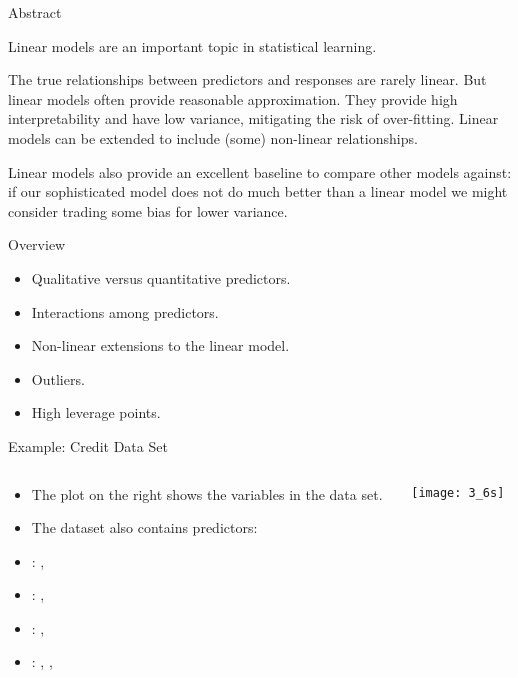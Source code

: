 \documentclass[mathserif, aspectratio=169]{beamer}
\subtitle{\bfseries%
  {Linear Regression, Part 3}\\%
  {\tiny\it qualitative predictors, interaction \& non-linear extensions, outliers, high leverage points}\\%
}
\begin{document}


\begin{frame}{Abstract}

	\begin{blurb}
		Linear models are an important topic in statistical learning.  

		The true relationships between predictors and responses are rarely linear.
		But linear models often provide reasonable approximation. They provide
		high interpretability and have low variance, mitigating the risk of over-fitting.
		Linear models can be extended to include (some) non-linear relationships. 

		Linear models also provide an excellent baseline to compare other models against: if 
		our sophisticated model does not do much better than a linear model we might consider
		trading some bias for lower variance.
	\end{blurb}
\end{frame}

\begin{frame}{Overview}
	\begin{itemize}
		\item Qualitative versus quantitative predictors.
		\item Interactions among predictors.
		\item Non-linear extensions to the linear model.
		\item Outliers. 
		\item High leverage points.
	\end{itemize}
\end{frame}

\begin{frame}{Example: Credit Data Set}
	\begin{columns}
		\begin{column}{0.5\textwidth}
			\begin{itemize}
				\item The plot on the right shows the  variables
					in the data set.
				\item The dataset also contains  predictors:
				\item[] : , 
				\item[] : , 
				\item[] : , 
				\item[] : , , 
			\end{itemize}
		\end{column}
		\begin{column}{0.5\textwidth}
			\vspace{-10mm}
			\begin{center}
				\texttt{[image: 3\_6s]}
			\end{center}
		\end{column}
	\end{columns}
\end{frame}
\end{document}

